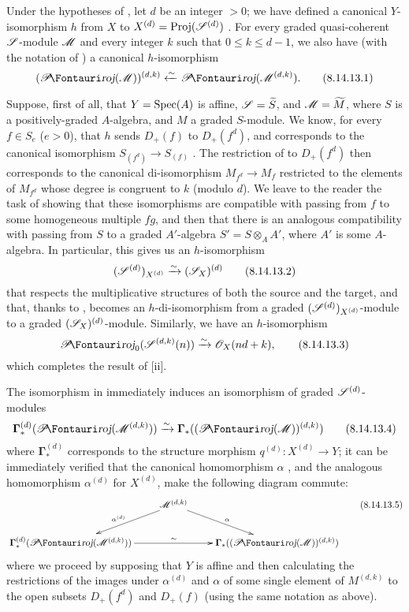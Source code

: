 \begin{remark}[8.14.13]
\label{II.8.14.13}
Under the hypotheses of , let $d$ be an integer $>0$;
we have defined a canonical $Y$-isomorphism $h$ from $X$ to $X^{(d)}=\operatorname{Proj}(\mathscr{S}^{(d)})$ .
For every
graded quasi-coherent $\mathscr{S}$-module $\mathscr{M}$ and every integer $k$ such that $0\leq k\leq d-1$, we also have (with the notation of ) a canonical $h$-isomorphism
\[
\label{II.8.14.13.1}
    (\shProj(\sh{M}))^{(d,k)} \xleftarrow{\sim} \shProj(\sh{M}^{(d,k)}).
\tag{8.14.13.1}
\]

Suppose, first of all, that $Y=\operatorname{Spec}(A)$ is affine, $\mathscr{S}=\widetilde{S}$, and $\mathscr{M}=\widetilde{M}$, where $S$ is a positively-graded $A$-algebra, and $M$ a graded $S$-module.
We know, for every $f\in S_e$ ($e>0$), that $h$ sends $D_+(f)$ to $D_+(f^d)$, and corresponds to the canonical isomorphism $S_{(f^d)}\to S_{(f)}$ .
The restriction of  to $D_+(f^d)$ then corresponds to the canonical di-isomorphism $M_{f^d}\to M_f$ restricted to the elements of $M_{f^d}$ whose degree is congruent to $k$ (modulo $d$).
We leave to the reader the task of showing that these isomorphisms are compatible with passing from $f$ to some homogeneous multiple $fg$, and then that there is an analogous compatibility with passing from $S$ to a graded $A'$-algebra $S'=S\otimes_A A'$, where $A'$ is some $A$-algebra.
In particular, this gives us an $h$-isomorphism
\[
\label{II.8.14.13.2}
    (\mathscr{S}^{(d)})_{X^{(d)}} \xrightarrow{\sim} (\mathscr{S}_X)^{(d)}
\tag{8.14.13.2}
\]
that respects the multiplicative structures of both the source and the target, and that, thanks to , becomes an $h$-di-isomorphism from a graded $(\mathscr{S}^{(d)})_{X^{(d)}}$-module to a graded $(\mathscr{S}_X)^{(d)}$-module.
Similarly, we have an $h$-isomorphism
\[
\label{II.8.14.13.3}
    \shProj_0(\sh{S}^{(d,k)}(n)) \xrightarrow{\sim} \sh{O}_X(nd+k),
\tag{8.14.13.3}
\]
which completes the result of [ii].

The isomorphism in  immediately induces an isomorphism of graded $\mathscr{S}^{(d)}$-modules
\[
\label{II.8.14.13.4}
    \boldsymbol{\Gamma}_*^{(d)}(\shProj(\sh{M}^{(d,k)})) \xrightarrow{\sim} \boldsymbol{\Gamma}_*((\shProj(\sh{M}))^{(d,k)})
\tag{8.14.13.4}
\]
where $\boldsymbol{\Gamma}_*^{(d)}$ corresponds to the structure morphism $q^{(d)}:X^{(d)}\to Y$;
it can be immediately verified that the canonical homomorphism $\alpha$ , and the analogous homomorphism $\alpha^{(d)}$ for $X^{(d)}$, make the following diagram commute:
\[
\label{II.8.14.13.5}
    \xymatrix{
        &\sh{M}^{(d,k)} \ar[dl]_{\alpha^{(d)}} \ar[dr]^{\alpha}&
    \\  \boldsymbol{\Gamma}_*^{(d)}(\shProj(\sh{M}^{(d,k)})) \ar[rr]^{\sim}
        && \boldsymbol{\Gamma}_*((\shProj(\sh{M}))^{(d,k)})
    }
\tag{8.14.13.5}
\]
where we proceed by supposing that $Y$ is affine and then calculating the restrictions of the images under $\alpha^{(d)}$ and $\alpha$ of some single element of $M^{(d,k)}$ to the open subsets $D_+(f^d)$ and $D_+(f)$ (using the same notation as above).
\end{remark}

